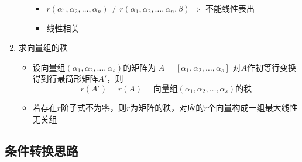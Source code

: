 \documentclass[a4paper,12pt]{article}
\begin{document}
\begin{enumerate}
\begin{enumerate}
\begin{itemize}
                \item $r(\alpha_1, \alpha_2, \dots, \alpha_n) \neq r(\alpha_1, \alpha_2, \dots, \alpha_n, \beta) \Rightarrow$ 不能线性表出
                \item 线性相关
            \end{itemize}
        \end{enumerate}
        \item 求向量组的秩
        \begin{itemize}
            \item 设向量组$(\alpha_1, \alpha_2, \dots, \alpha_s)$的矩阵为 $A = [\alpha_1, \alpha_2, \dots, \alpha_s]$ 对$A$作初等行变换得到行最简形矩阵$A'$，则
            \[
                r(A') = r(A) = \text{向量组}(\alpha_1, \alpha_2, \dots, \alpha_s)\text{的秩}
            \]
            \item 若存在$r$阶子式不为零，则$r$为矩阵的秩，对应的$r$个向量构成一组最大线性无关组
        \end{itemize}
    \end{enumerate}

    \subsection{条件转换思路}
\end{document}
